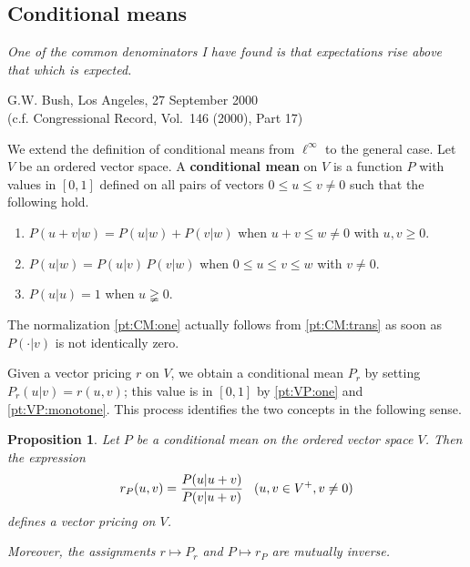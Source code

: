 \documentclass[11pt]{amsart}
\numberwithin{equation}{section}
\newtheorem{prop}[thm]{Proposition}
\theoremstyle{definition}
\theoremstyle{definition}
\begin{document}
\subsection{Conditional means}\label{sec:CM}%
\begin{flushright}
\begin{minipage}[t]{0.85\linewidth}\itshape
One of the common denominators I have found is that expectations rise above that which is expected.
\end{minipage}
\end{flushright}
\begin{flushright}
\begin{minipage}[t]{0.75\linewidth}\small
G.W. Bush, Los Angeles, 27 September 2000\\
(c.f. Congressional Record, Vol.~146 (2000), Part 17)
\end{minipage}
\end{flushright}
% 
We extend the definition of conditional means from $\ell^\infty$ to the general case. Let $V$ be an ordered vector space. A \textbf{conditional mean} on $V$ is a function $P$ with values in $[0,1]$ defined on all pairs of vectors $0\leq u\leq v \neq 0$ such that the following hold.%
\begin{enumerate}[left=2\parindent, labelsep=\parindent, topsep=3pt, itemsep=3pt, label=\normalfont(CM\arabic*)]
\item $P(u+v | w) = P(u| w)+P(v | w)$ when $u+v\leq w\neq 0$ with $u,v\geq 0$. \label{pt:CM:add}
\item $P(u|w) = P(u|v)\, P(v|w)$ when $0\leq u \leq v \leq w$ with $v\neq 0$.\label{pt:CM:trans}
\item $P(u|u)=1$ when $u\gneqq 0$.\label{pt:CM:one}
\end{enumerate}

\noindent
The normalization \ref{pt:CM:one} actually follows from \ref{pt:CM:trans} as soon as $P(\cdot| v)$ is not identically zero.

\medskip
Given a vector pricing $r$ on $V$, we obtain a conditional mean $P_r$ by setting $P_r(u|v) = r(u,v)$; this value is in $[0, 1]$ by \ref{pt:VP:one} and \ref{pt:VP:monotone}. This process identifies the two concepts in the following sense.

\begin{prop}\label{prop:VP:CM:equiv}
Let $P$ be a conditional mean on the ordered vector space $V$. Then the expression
\begin{equation*}
r_P(u,v) = \frac{P(u|u+v)}{P(v|u+v)}\kern3mm (u,v\in V^+, v\neq 0)
\end{equation*}
defines a vector pricing on $V$.

Moreover, the assignments $r\mapsto P_r$ and $P\mapsto r_P$ are mutually inverse.
\end{prop}
\end{document}
